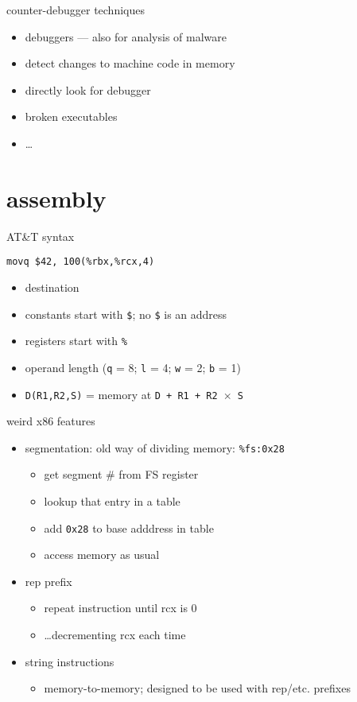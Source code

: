 \begin{frame}{counter-debugger techniques}
\begin{itemize}
\item debuggers --- also for analysis of malware
\vspace{.5cm}
\item detect changes to machine code in memory
\item directly look for debugger
    \item broken executables
    \item \ldots
    \end{itemize}
\end{frame}
\section{assembly}

\begin{frame}[fragile,label=att1]{AT\&T syntax}
\begin{lstlisting}
movq $42, 100(%rbx,%rcx,4)
\end{lstlisting}
    \begin{itemize}
    \item destination 
    \item constants start with {\tt \$}; no {\tt \$} is an address
    \item registers start with {\tt \%}
    \item operand length ({\tt q} = 8; {\tt l} = 4; {\tt w} = 2; {\tt b} = 1)
    \item {\tt D(R1,R2,S)} = memory at {\tt D + R1 + R2 $\times$ S}
    \end{itemize}
\end{frame}

\begin{frame}{weird x86 features}
    \begin{itemize}
    \item segmentation: old way of dividing memory: {\tt \%fs:0x28} 
        \begin{itemize}
        \item get segment \# from FS register
        \item lookup that entry in a table
        \item add {\tt 0x28} to base adddress in table
        \item access memory as usual
        \end{itemize}
    \item rep prefix
        \begin{itemize}
        \item repeat instruction until rcx is 0
        \item \ldots decrementing rcx each time
        \end{itemize}
    \item string instructions
        \begin{itemize}
        \item memory-to-memory; designed to be used with rep/etc. prefixes
        \end{itemize}
    \end{itemize}
\end{frame}

